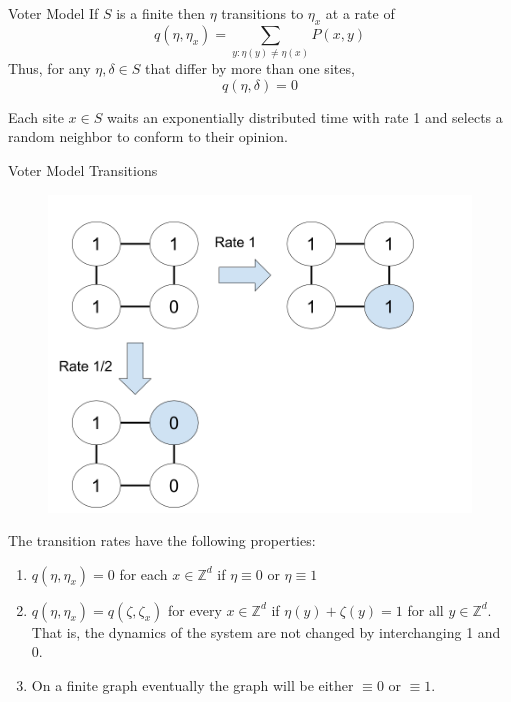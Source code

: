 \documentclass{beamer}
\theoremstyle{definition}
\newcommand{\Z}{\mathbb{Z}}
\begin{document}
\begin{frame}{Voter Model}
If $S$ is a finite then $\eta$ transitions to $\eta_x$ at a rate of
$$
q(\eta, \eta_x) = \sum_{y : \eta(y) \not = \eta(x)} P(x,y)
$$
Thus, for any $\eta, \delta \in S$ that differ by more than one sites,
$$
q(\eta, \delta) = 0
$$

Each site $x \in S$ waits an exponentially distributed time with rate 1 and selects a random neighbor to conform to their opinion. 


\end{frame}

\begin{frame}{Voter Model Transitions}
    \begin{figure}[H]
  \centering
    \includegraphics[width=.80\textwidth]{figures/voter_model_config_example.png}
\end{figure}
\end{frame}

\begin{frame}
The transition rates have the following properties:
\begin{enumerate}
    \item $q(\eta, \eta_x) = 0$ for each $x \in \Z^d$ if $\eta \equiv 0$ or $\eta \equiv 1$
    \item $q(\eta, \eta_x) = q(\zeta, \zeta_x)$ for every $x \in \Z^d$ if $\eta(y) + \zeta(y) = 1$ for all $y \in \Z^d$. That is, the dynamics of the system are not changed by interchanging 1 and 0.
    \item On a finite graph eventually the graph will be either $\equiv 0$ or $\equiv 1$.
\end{enumerate}
\end{frame}
\end{document}

